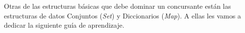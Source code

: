 Otras de las estructuras básicas que debe dominar un concursante están las estructuras de
datos Conjuntos (\emph{Set}) y Diccionarios (\emph{Map}). A ellas les vamos a dedicar la siguiente guía de aprendizaje.